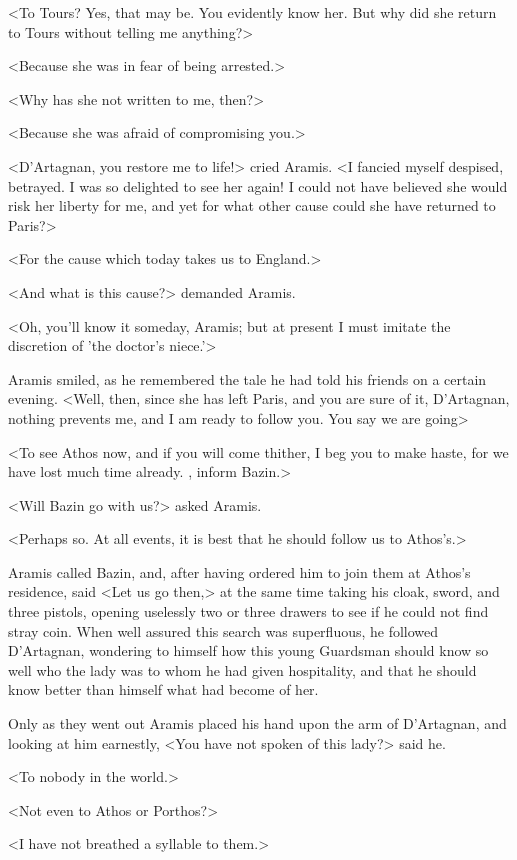 <To Tours? Yes, that may be. You evidently know her. But why did she return to Tours without telling me anything?> 

<Because she was in fear of being arrested.> 

<Why has she not written to me, then?> 

<Because she was afraid of compromising you.> 

<D'Artagnan, you restore me to life!> cried Aramis. <I fancied myself despised, betrayed. I was so delighted to see her again! I could not have believed she would risk her liberty for me, and yet for what other cause could she have returned to Paris?> 

<For the cause which today takes us to England.> 

<And what is this cause?> demanded Aramis. 

<Oh, you'll know it someday, Aramis; but at present I must imitate the discretion of 'the doctor's niece.'> 

Aramis smiled, as he remembered the tale he had told his friends on a certain evening. <Well, then, since she has left Paris, and you are sure of it, D'Artagnan, nothing prevents me, and I am ready to follow you. You say we are going\longdash> 

<To see Athos now, and if you will come thither, I beg you to make haste, for we have lost much time already. , inform Bazin.> 

<Will Bazin go with us?> asked Aramis. 

<Perhaps so. At all events, it is best that he should follow us to Athos's.> 

Aramis called Bazin, and, after having ordered him to join them at Athos's residence, said <Let us go then,> at the same time taking his cloak, sword, and three pistols, opening uselessly two or three drawers to see if he could not find stray coin. When well assured this search was superfluous, he followed D'Artagnan, wondering to himself how this young Guardsman should know so well who the lady was to whom he had given hospitality, and that he should know better than himself what had become of her. 

Only as they went out Aramis placed his hand upon the arm of D'Artagnan, and looking at him earnestly, <You have not spoken of this lady?> said he. 

<To nobody in the world.> 

<Not even to Athos or Porthos?> 

<I have not breathed a syllable to them.> 

